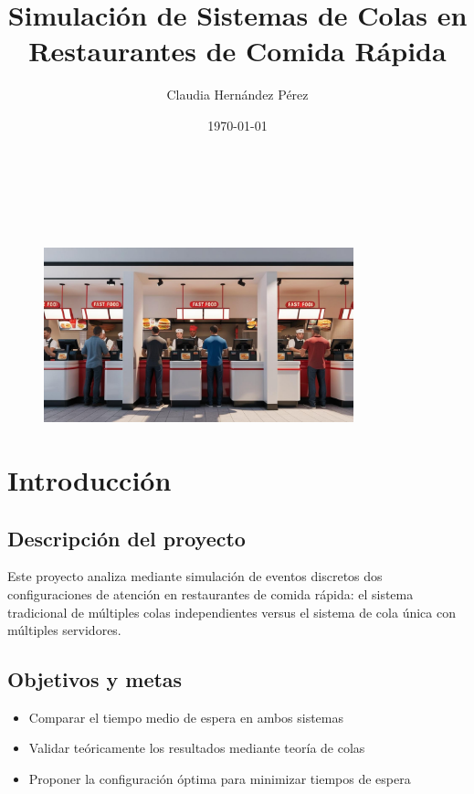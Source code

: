 \documentclass{article}
\title{Simulación de Sistemas de Colas en Restaurantes de Comida Rápida}
\author{Claudia Hernández Pérez}
\date{\today}
\begin{document}
\maketitle

\

\

\begin{figure}[h]
\centering
\includegraphics[width=0.8\textwidth]{./images/restaurant.jpg}
\end{figure}

\newpage

\tableofcontents

\newpage

\section{Introducción}\label{sec:introduccion}
\subsection{Descripción del proyecto}
Este proyecto analiza mediante simulación de eventos discretos dos configuraciones de atención en restaurantes de comida rápida: el sistema tradicional de múltiples colas independientes versus el sistema de cola única con múltiples servidores.

\subsection{Objetivos y metas}
\begin{itemize}
\item Comparar el tiempo medio de espera en ambos sistemas
\item Validar teóricamente los resultados mediante teoría de colas
\item Proponer la configuración óptima para minimizar tiempos de espera
\end{itemize}
\end{document}
